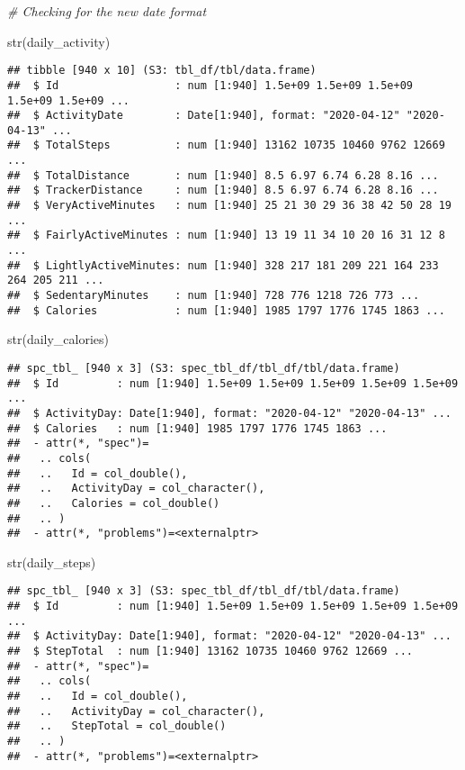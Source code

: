 \documentclass[
]{article}
\newenvironment{Shaded}{\begin{snugshade}}{\end{snugshade}}
\newcommand{\CommentTok}[1]{\textcolor[rgb]{0.56,0.35,0.01}{\textit{#1}}}
\newcommand{\FunctionTok}[1]{\textcolor[rgb]{0.00,0.00,0.00}{#1}}
\newcommand{\NormalTok}[1]{#1}
\begin{document}
\begin{Shaded}
\begin{Highlighting}[]
\CommentTok{\# Checking for the new date format }

\FunctionTok{str}\NormalTok{(daily\_activity)}
\end{Highlighting}
\end{Shaded}

\begin{verbatim}
## tibble [940 x 10] (S3: tbl_df/tbl/data.frame)
##  $ Id                  : num [1:940] 1.5e+09 1.5e+09 1.5e+09 1.5e+09 1.5e+09 ...
##  $ ActivityDate        : Date[1:940], format: "2020-04-12" "2020-04-13" ...
##  $ TotalSteps          : num [1:940] 13162 10735 10460 9762 12669 ...
##  $ TotalDistance       : num [1:940] 8.5 6.97 6.74 6.28 8.16 ...
##  $ TrackerDistance     : num [1:940] 8.5 6.97 6.74 6.28 8.16 ...
##  $ VeryActiveMinutes   : num [1:940] 25 21 30 29 36 38 42 50 28 19 ...
##  $ FairlyActiveMinutes : num [1:940] 13 19 11 34 10 20 16 31 12 8 ...
##  $ LightlyActiveMinutes: num [1:940] 328 217 181 209 221 164 233 264 205 211 ...
##  $ SedentaryMinutes    : num [1:940] 728 776 1218 726 773 ...
##  $ Calories            : num [1:940] 1985 1797 1776 1745 1863 ...
\end{verbatim}

\begin{Shaded}
\begin{Highlighting}[]
\FunctionTok{str}\NormalTok{(daily\_calories)}
\end{Highlighting}
\end{Shaded}

\begin{verbatim}
## spc_tbl_ [940 x 3] (S3: spec_tbl_df/tbl_df/tbl/data.frame)
##  $ Id         : num [1:940] 1.5e+09 1.5e+09 1.5e+09 1.5e+09 1.5e+09 ...
##  $ ActivityDay: Date[1:940], format: "2020-04-12" "2020-04-13" ...
##  $ Calories   : num [1:940] 1985 1797 1776 1745 1863 ...
##  - attr(*, "spec")=
##   .. cols(
##   ..   Id = col_double(),
##   ..   ActivityDay = col_character(),
##   ..   Calories = col_double()
##   .. )
##  - attr(*, "problems")=<externalptr>
\end{verbatim}

\begin{Shaded}
\begin{Highlighting}[]
\FunctionTok{str}\NormalTok{(daily\_steps)}
\end{Highlighting}
\end{Shaded}

\begin{verbatim}
## spc_tbl_ [940 x 3] (S3: spec_tbl_df/tbl_df/tbl/data.frame)
##  $ Id         : num [1:940] 1.5e+09 1.5e+09 1.5e+09 1.5e+09 1.5e+09 ...
##  $ ActivityDay: Date[1:940], format: "2020-04-12" "2020-04-13" ...
##  $ StepTotal  : num [1:940] 13162 10735 10460 9762 12669 ...
##  - attr(*, "spec")=
##   .. cols(
##   ..   Id = col_double(),
##   ..   ActivityDay = col_character(),
##   ..   StepTotal = col_double()
##   .. )
##  - attr(*, "problems")=<externalptr>
\end{verbatim}
\end{document}
